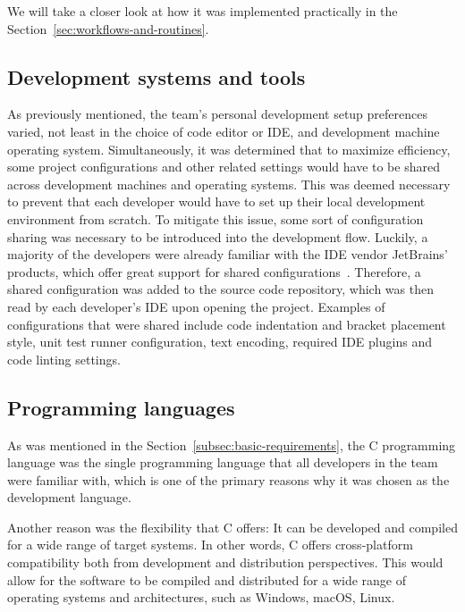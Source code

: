 We will take a closer look at how it was implemented practically in the Section~\ref{sec:workflows-and-routines}.

\subsection{Development systems and tools}\label{subsec:development-systems-and-tools}

As previously mentioned, the team's personal development setup preferences varied, not least in the choice of code
editor or IDE, and development machine operating system.
Simultaneously, it was determined that to maximize efficiency, some project configurations and other related settings
would have to be shared across development machines and operating systems.
This was deemed necessary to prevent that each developer would have to set up their local development environment
from scratch.
To mitigate this issue, some sort of configuration sharing was necessary to be introduced into the development flow.
Luckily, a majority of the developers were already familiar with the IDE vendor JetBrains' products, which offer great
support for shared configurations~\cite{shared-config}.
Therefore, a shared configuration was added to the source code repository, which was then read by each developer's
IDE upon opening the project.
Examples of configurations that were shared include code indentation and bracket placement style, unit test runner
configuration, text encoding, required IDE plugins and code linting settings.

\subsection{Programming languages}\label{subsec:programming-languages}

As was mentioned in the Section~\ref{subsec:basic-requirements}, the C programming language was the single
programming language that all developers in the team were familiar with, which is one of the primary reasons why it was
chosen as the development language.

Another reason was the flexibility that C offers: It can be developed and compiled for a wide range of target systems.
In other words, C offers cross-platform compatibility both from development and distribution perspectives.
This would allow for the software to be compiled and distributed for a wide range of operating systems and
architectures, such as Windows, macOS, Linux.

